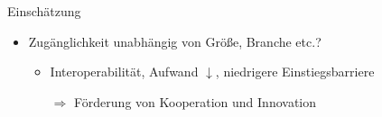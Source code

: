 \begin{frame}{Einschätzung}
\begin{itemize}
        \pause
        \item Zugänglichkeit unabhängig von Größe, Branche etc.?
        \pause
        \begin{itemize}
            \item Interoperabilität, Aufwand $\downarrow$, niedrigere Einstiegsbarriere

            \pause
            \item[$\Rightarrow$] Förderung von Kooperation und Innovation
        \end{itemize}
    \end{itemize}
\end{frame}


